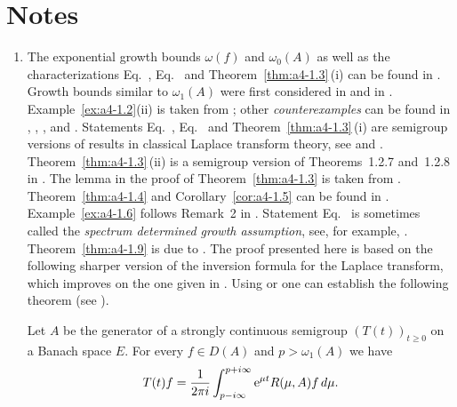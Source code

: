 \section*{Notes}
\begin{enumerate}[label=\emph{Section 4.\arabic*:}, wide, itemsep=1ex]

\item 
The exponential growth bounds $\omega(f)$ and $\omega_{0}(A)$ as well as the characterizations Eq.~, Eq.~ and Theorem~\ref{thm:a4-1.3}\,(i) can be found in \textcite{hillephillips:1957}.
Growth bounds similar to $\omega_{1}(A)$ were first considered in \textcite{djacenko:1976} and in \textcite[Proposition~2]{zabczyk:1979}. 
Example~\ref{ex:a4-1.2}(ii) is taken from \textcite{wolff:1981}; other \emph{counterexamples} can be found in \textcite{hillephillips:1957}, \textcite{foias:1973}, \textcite{triggiani:1975a}, 
\textcite{zabczyk:1975} and \textcite{greinervoigtwolff:1981}. 
Statements Eq.~, Eq.~ and Theorem~\ref{thm:a4-1.3}\,(i) are semigroup versions of results in classical Laplace transform theory, see \textcite{hillephillips:1957} and \textcite{widder:1946}. 
Theorem~\ref{thm:a4-1.3}\,(ii) is a semigroup version of Theorems~1.2.7 and~1.2.8 in \textcite{doetsch:1950}. 
The lemma in the proof of Theorem~\ref{thm:a4-1.3} is taken from \textcite{milstein:1975}. 
Theorem~\ref{thm:a4-1.4} and Corollary~\ref{cor:a4-1.5} can be found in \textcite{neubrander:1985a}. 
Example~\ref{ex:a4-1.6} follows Remark~2 in \textcite{zabczyk:1975}. 
Statement Eq.~ is sometimes called the \emph{spectrum determined growth assumption}, see, for example, \textcite{triggiani:1975b}. 
Theorem~\ref{thm:a4-1.9} is due to \textcite{slemrod:1976}. 
The proof presented here is based on the following sharper version of the inversion formula for the Laplace transform, which improves on the one given in \textcite[p.349]{hillephillips:1957}. 
Using \textcite[p.66]{widder:1946} or \textcite[p.212]{doetsch:1950} one can establish the following theorem (see \textcite{neubrander:1984b}).
\begin{theorem}\label{thm:a4-2.6}
Let $A$ be the generator of a strongly continuous semigroup $(T(t))_{t \geq 0}$ on a Banach space $E$. 
For every $f \in D(A)$ and $p > \omega_{1}(A)$ we have
\[
T(t)f = \frac{1}{2\pi i} \int_{p-i\infty}^{p+i\infty} \mathrm{e}^{\mu t}R(\mu,A)f \, d\mu.
\]
\end{theorem}
 


\end{enumerate}
